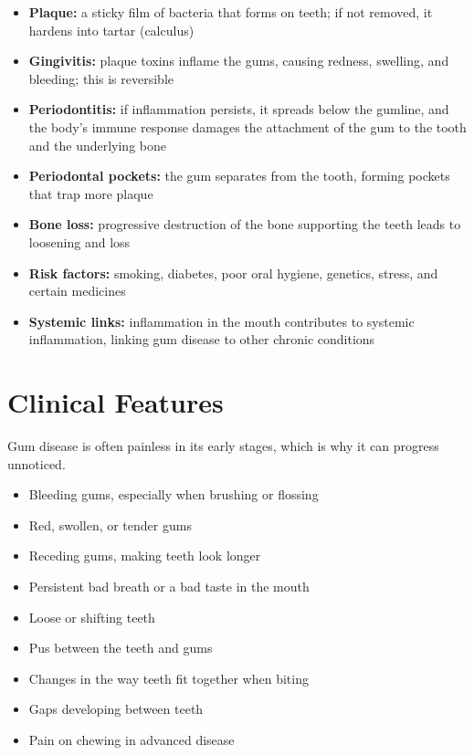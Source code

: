 \begin{itemize}
    \item \textbf{Plaque:} a sticky film of bacteria that forms on teeth; if not removed, it hardens into tartar (calculus)
    \item \textbf{Gingivitis:} plaque toxins inflame the gums, causing redness, swelling, and bleeding; this is reversible
    \item \textbf{Periodontitis:} if inflammation persists, it spreads below the gumline, and the body's immune response damages the attachment of the gum to the tooth and the underlying bone
    \item \textbf{Periodontal pockets:} the gum separates from the tooth, forming pockets that trap more plaque
    \item \textbf{Bone loss:} progressive destruction of the bone supporting the teeth leads to loosening and loss
    \item \textbf{Risk factors:} smoking, diabetes, poor oral hygiene, genetics, stress, and certain medicines
    \item \textbf{Systemic links:} inflammation in the mouth contributes to systemic inflammation, linking gum disease to other chronic conditions
\end{itemize}

\section*{Clinical Features}
Gum disease is often painless in its early stages, which is why it can progress unnoticed.

\begin{itemize}
    \item Bleeding gums, especially when brushing or flossing
    \item Red, swollen, or tender gums
    \item Receding gums, making teeth look longer
    \item Persistent bad breath or a bad taste in the mouth
    \item Loose or shifting teeth
    \item Pus between the teeth and gums
    \item Changes in the way teeth fit together when biting
    \item Gaps developing between teeth
    \item Pain on chewing in advanced disease
\end{itemize}

